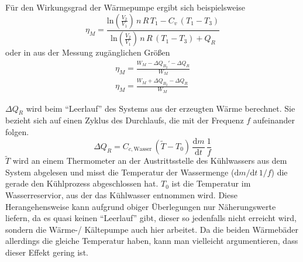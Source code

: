 \documentclass[a4paper, 12pt,]{scrartcl}
\begin{document}
Für den Wirkungsgrad der Wärmepumpe ergibt sich beispielsweise
\begin{equation*}\eta_M=\frac{\text{ln}\left(\frac{V_2}{V_1}\right)\,n\,R\,T_1-C_v\,(T_1-T_3)}{\text{ln}\left(\frac{V_2}{V_1}\right)\,n\,R\,(T_1-T_3)+Q_R}\end{equation*}
oder in aus der Messung zugänglichen Größen
\begin{gather*}\eta_M=\frac{W_M-\Delta{Q_{B_2}}'-\Delta{Q_R}}{W_M}\\
\eta_M=\frac{W_M+\Delta{Q_{B_2}}-\Delta{Q_R}}{W_M}\end{gather*}











$\Delta{Q_R}$ wird beim ``Leerlauf'' des Systems aus der erzeugten Wärme berechnet. Sie bezieht sich auf einen Zyklus des Durchlaufs, die mit der Frequenz $f$ aufeinander folgen. 
\begin{equation}\Delta{Q_R}=C_{c,\text{Wasser}}\,(\tilde{T}-T_0)\,\frac{\text{d}m}{\text{d}t}\,\frac{1}{f}\end{equation}
$\tilde{T}$ wird an einem Thermometer an der Austrittsstelle des Kühlwassers aus dem System abgelesen und misst die Temperatur der Wassermenge ($\text{d}m/\text{d}t\,1/f$) die gerade den Kühlprozess abgeschlossen hat. $T_0$ ist die Temperatur im Wasserreservior, aus der das Kühlwasser entnommen wird. Diese Herangehensweise kann aufgrund obiger Überlegungen nur Näherungswerte liefern, da es quasi keinen ``Leerlauf'' gibt, dieser so jedenfalls nicht erreicht wird, sondern die Wärme-/ Kältepumpe auch hier arbeitet. Da die beiden Wärmebäder allerdings die gleiche Temperatur haben, kann man vielleicht argumentieren, dass dieser Effekt gering ist.
\end{document}

